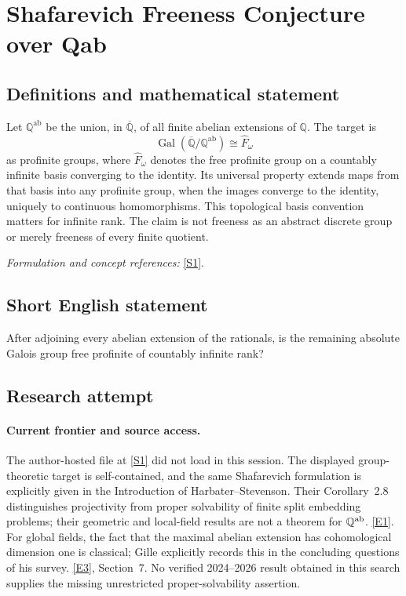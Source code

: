 \documentclass[11pt,a4paper]{article}
\newcommand{\Q}{\mathbb{Q}}
\newcommand{\sref}[2]{\hyperlink{source:#1:#2}{[S#2]}}
\newcommand{\eref}[2]{\hyperlink{extra:#1:#2}{[E#2]}}
\newif\ifshowcatalogue
\newcommand{\cataloguescope}[1]{\ifshowcatalogue
 \paragraph{Exact scope in the supplied catalogue.}
 \begin{quote}\small #1\end{quote}\fi}
\numberwithin{equation}{section}
\begin{document}
\setcounter{section}{0}
\clearpage
\section*{\texorpdfstring{Shafarevich Freeness Conjecture over Qab}{Shafarevich Freeness Conjecture over Qab}}\label{statement}
\subsection{Definitions and mathematical statement}
Let $\Q^{\mathrm{ab}}$ be the union, in $\overline{\Q}$, of all finite abelian extensions of $\Q$. The target is
\[
 \operatorname{Gal}(\overline{\Q}/\Q^{\mathrm{ab}})\cong\widehat F_\omega
\]
as profinite groups, where $\widehat F_\omega$ denotes the free profinite group on a countably infinite basis converging to the identity. Its universal property extends maps from that basis into any profinite group, when the images converge to the identity, uniquely to continuous homomorphisms. This topological basis convention matters for infinite rank. The claim is not freeness as an abstract discrete group or merely freeness of every finite quotient.
\par\smallskip\textit{Formulation and concept references:} \sref{statement}{1}.
\cataloguescope{Let Qab be the maximal abelian extension of Q in an algebraic closure Qbar (equivalently the maximal cyclotomic extension). The absolute Galois group Gal(Qbar/Qab) is a free profinite group of countably infinite rank, in the standard profinite convention of a free basis converging to the identity.}
\subsection{Short English statement}
After adjoining every abelian extension of the rationals, is the remaining absolute Galois group free profinite of countably infinite rank?
\subsection{Research attempt}

\paragraph{Current frontier and source access.}
The author-hosted file at \sref{statement}{1} did not load in this session.
The displayed group-theoretic target is self-contained, and the same
Shafarevich formulation is explicitly given in the Introduction of
Harbater--Stevenson. Their Corollary~2.8 distinguishes projectivity from
proper solvability of finite split embedding problems; their geometric
and local-field results are not a theorem for $\Q^{\rm ab}$.
\eref{statement}{1}. For global fields, the fact that the maximal abelian
extension has cohomological dimension one is classical; Gille explicitly
records this in the concluding questions of his survey.
\eref{statement}{3}, Section~7. No verified 2024--2026 result obtained in this
search supplies the missing unrestricted proper-solvability assertion.
\end{document}

